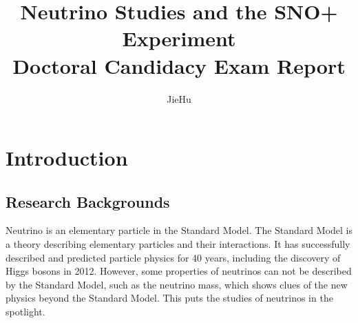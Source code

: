 \documentclass[preprint,12pt]{elsarticle}
\numberwithin{equation}{section}
\begin{document}
\begin{frontmatter}



\title{Neutrino Studies and the SNO+ Experiment\\
	Doctoral Candidacy Exam Report
	}


\author{Jie\quad Hu}

\address{Department of Physics, University of Alberta}

\end{frontmatter}


\section{Introduction}

\subsection{Research Backgrounds}
Neutrino is an elementary particle in the Standard Model. The Standard Model is a theory describing elementary particles and their interactions. It has successfully described and predicted particle physics for 40 years, including the discovery of Higgs bosons in 2012. However, some properties of neutrinos can not be described by the Standard Model, such as the neutrino mass, which shows clues of the new physics beyond the Standard Model. This puts the studies of neutrinos in the spotlight.
\end{document}
